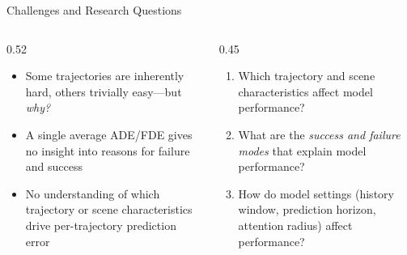 \begin{frame}{Challenges and Research Questions}
  \begin{columns}
    \begin{column}{0.52\textwidth}
      \begin{itemize}[<1->]
        \item Some trajectories are inherently hard, others trivially
              easy---but \emph{why?}
        \item A single average ADE/FDE gives no insight into reasons
              for failure and success
        \item No understanding of which trajectory or scene characteristics
              drive per-trajectory prediction error
      \end{itemize}
      \vspace{0.4em}
    \end{column}
    \begin{column}{0.45\textwidth}
      \begin{enumerate}
        \item<3-> Which trajectory and scene characteristics affect model
              performance?
        \item<4-> What are the \emph{success and failure modes} that explain
              model performance?
        \item<5-> How do model settings (history window, prediction horizon,
              attention radius) affect performance?
      \end{enumerate}
    \end{column}
  \end{columns}
\end{frame}
